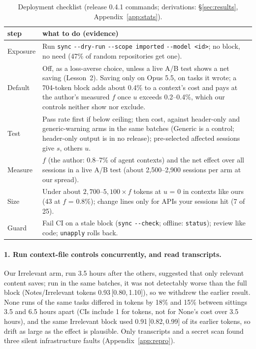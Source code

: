 \documentclass[11pt]{article}
\newcommand{\ci}[2]{\,[#1,\,#2]}
\newcommand{\code}[1]{\texttt{#1}}
\newcommand{\flag}[1]{\texttt{-{}-#1}}%
\newcommand{\aNone}{\textsf{None}\xspace}
\newcommand{\aNotes}{\textsf{Notes}\xspace}
\newcommand{\aIrr}{\textsf{Irrelevant}\xspace}
\newcommand{\aGen}{\textsf{Generic}\xspace}
\begin{document}
\begin{table}[t]
\centering
\footnotesize
\setlength{\tabcolsep}{2pt}
\begin{tabular}{@{}l>{\raggedright\arraybackslash}p{}@{}}
\toprule
step & what to do (evidence) \\
\midrule
Exposure & Run \code{sync} \flag{dry-run} \flag{scope}~\code{imported} \flag{model}~\code{<id>}; no block, no need (47\% of random repositories get one). \\
Default & Off, as a loss-averse choice, unless a live A/B test shows a net saving (Lesson~2). Saving only on Opus 5.5, on tasks it wrote; a 704-token block adds about 0.4\% to a context's cost and pays at the author's measured $f$ once $u$ exceeds 0.2--0.4\%, which our controls neither show nor exclude. \\
Test & Pass rate first if below ceiling; then cost, against header-only and generic-warning arms in the same batches (\aGen is a control; header-only output is in no release); pre-selected affected sessions give $s$, others $u$. \\
Measure & $f$ (the author: 0.8--7\% of agent contexts) and the net effect over all sessions in a live A/B test (about 2,500--2,900 sessions per arm at our spread). \\
Size & Under about $2{,}700$--$5{,}100 \times f$ tokens at $u$ = 0 in contexts like ours (43 at $f$ = 0.8\%); change lines only for APIs your sessions hit (7 of 25). \\
Guard & Fail CI on a stale block (\code{sync} \flag{check}; offline: \code{status}); review like code; \code{unapply} rolls back. \\
\bottomrule
\end{tabular}
\caption{Deployment checklist (release 0.4.1 commands; derivations: \S\ref{sec:results}, Appendix~\ref{app:stats}).}
\label{tab:checklist}
\end{table}

\paragraph{1. Run context-file controls concurrently, and read transcripts.}
Our \aIrr arm, run 3.5 hours after the others, suggested that only relevant content saves; run in the same batches, it was not detectably worse than the full block (\aNotes/\aIrr tokens 0.93\ci{0.80}{1.10}), so we withdrew the earlier result.
\aNone runs of the same tasks differed in tokens by 18\% and 15\% between sittings 3.5 and 6.5 hours apart (CIs include 1 for tokens, not for \aNone's cost over 3.5 hours), and the same \aIrr block used 0.91\ci{0.82}{0.99} of its earlier tokens, so drift as large as the effect is plausible.
Only transcripts and a secret scan found three silent infrastructure faults (Appendix~\ref{app:repro}).
\end{document}
